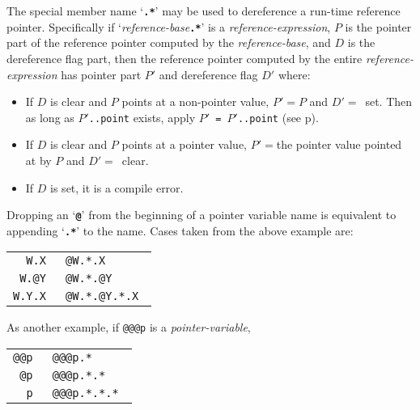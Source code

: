 \documentclass[12pt]{article}
\newcommand{\TT}[1]{{\tt \bfseries #1}}
\newcommand{\pagref}[1]{p\pageref{#1}}
\begin{document}
The special member name `\TT{.*}' may be used to dereference
a run-time reference pointer.  Specifically if `{\em reference-base}\TT{.*}' is
a {\em reference-expression}, $P$ is the pointer part of the
reference pointer computed by the {\em reference-base}, and $D$
is the dereference flag part, then the reference pointer computed by
the entire {\em reference-expression} has pointer part $P'$ and dereference
flag $D'$ where:
\begin{itemize}
\item If $D$ is clear and $P$ points at a non-pointer value,
$P'=P$ and $D'=$~set.  Then as long as {\tt $P'$..point} exists,
apply {\tt $P'$ = $P'$..point} (see \pagref{..POINT}).
\item If $D$ is clear and $P$ points at a pointer value,
$P'=$the pointer value pointed at by $P$ and $D'=$~clear.
\item If $D$ is set, it is a compile error.
\end{itemize}

Dropping an `\TT{@}' from the beginning of a pointer variable name
is equivalent to appending `\TT{.*}' to the name.  Cases taken
from the above example are:
\begin{center}
\begin{tabular}{r@{~~is equivalent to~~}l}
\tt W.X & \tt @W.*.X \\
\tt W.@Y & \tt @W.*.@Y \\
\tt W.Y.X & \tt @W.*.@Y.*.X \\
\end{tabular}
\end{center}

As another example, if {\tt @@@p} is a {\em pointer-variable},
\begin{center}
\begin{tabular}{r@{~~is equivalent to~~}l}
\tt @@p & \tt @@@p.* \\
\tt @p & \tt @@@p.*.* \\
\tt p & \tt @@@p.*.*.* \\
\end{tabular}
\end{center}
\end{document}
